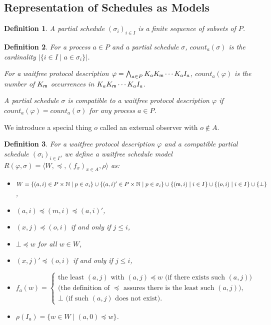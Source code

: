 \documentclass[doctor]{iscs-thesis}
\newcommand{\tuple}[1]{\langle{#1}\rangle}
\newcommand{\memory}{{\sf m}}
\newtheorem{definition}{Definition}
\begin{document}
\subsection{Representation of Schedules as Models}

\begin{definition}
 A partial schedule $(\sigma_i)_{i\in I}$ is a finite sequence of
 subsets of $P$.
\end{definition}

\begin{definition}
 For a process $a\in P$ and a partial schedule $\sigma$, $count_a(\sigma)$ is the cardinality
 $\left|\{i\in I\mid a\in \sigma_i\}\right|$.

 For a waitfree protocol description $\varphi = \bigwedge_{a\in P}K_a K_\memory \cdots K_a I_a$,
 $count_a(\varphi)$ is the number of $K_\memory$ occurrences in $K_aK_\memory \cdots
 K_a I_a$.

 A partial schedule $\sigma$ is \textit{compatible} to a waitfree
 protocol description $\varphi$ if
 $count_a(\varphi) = count_a(\sigma)$ for any process $a\in P$.
\end{definition}

We introduce a special thing $o$ called an external observer with $o \notin A$.
\begin{definition}
 For a waitfree protocol description $\varphi$ and
 a compatible partial schedule $(\sigma_i)_{i\in I}$, we define
 a waitfree schedule model $R(\varphi, \sigma) = \tuple{W, \preceq, (f_x)_{x\in A}, \rho}$ as:
\begin{itemize}
 \item $
	W = \{(a,i) \in P\times \mathbb N \mid p\in \sigma_i\} \cup
       \{(a,i)' \in P\times \mathbb N \mid p\in \sigma_i\} 
	 \cup \{(\memory,i)\mid i\in I\} \cup \{(o,i) \mid i\in I\}\cup 
       \{\bot\}
       $,
 \item $(a,i) \preceq (m, i)\preceq (a, i)'$,
 \item $(x,j)\preceq (o,i)$ if and only if $j\le i$,
 \item $\bot\preceq w$ for all $w \in W$,
 \item $(x,j)'\preceq (o,i)$ if and only if $j \le i$,
 \item 
$
f_a(w) =
\left\{
\begin{array}{l}
 \mbox{the least $(a,j)$ with $(a,j)\preceq w$ (if there exists such $(a,j)$)} \\ 
  \mbox{(the definition of $\preceq$ assures there is the least such $(a,j)$)},\\
 \mbox{$\bot$ (if such $(a,j)$ does not exist)}.
\end{array}
\right.
$
 \item $\rho(I_a) = \{w\in W\mid (a,0)\preceq w\}$.
\end{itemize}
\end{definition}
\end{document}
